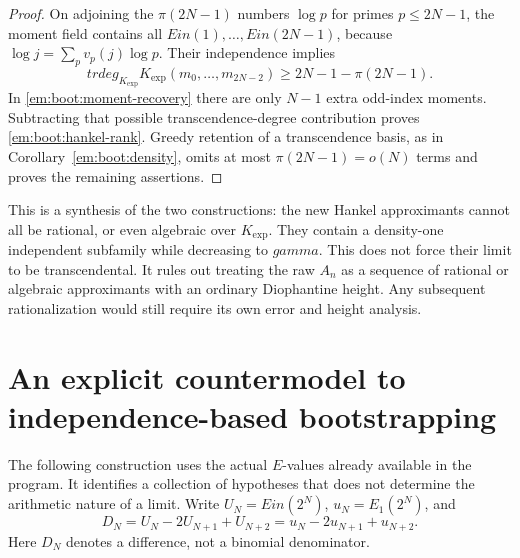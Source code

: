 \documentclass[11pt,a4paper]{article}
\DeclareMathOperator{\Ein}{Ein}
\theoremstyle{definition}
\theoremstyle{remark}
\theoremstyle{plain}
\numberwithin{equation}{section}
\def\Ein{Ein}\def\gamma{gamma}\def\delta{delta}\def\eta{eta}%
\def\operatorname#1{#1}\def\mathrm#1{#1}}
\begin{document}
\begin{proof}
On adjoining the $\pi(2N-1)$ numbers $\log p$ for primes
$p\le2N-1$, the moment field contains all
$\operatorname{Ein}(1),\ldots,\operatorname{Ein}(2N-1)$, because
$\log j=\sum_pv_p(j)\log p$. Their independence implies
\[
 \operatorname{trdeg}_{K_{\exp}}
 K_{\exp}(m_0,\ldots,m_{2N-2})
 \ge2N-1-\pi(2N-1).
\]
In \eqref{em:boot:moment-recovery} there are only $N-1$ extra odd-index
moments. Subtracting that possible transcendence-degree contribution
proves \eqref{em:boot:hankel-rank}. Greedy retention of a transcendence
basis, as in Corollary~\ref{em:boot:density}, omits at most
$\pi(2N-1)=o(N)$ terms and proves the remaining assertions.
\end{proof}

This is a synthesis of the two constructions: the new Hankel
approximants cannot all be rational, or even algebraic over $K_{\exp}$.
They contain a density-one independent subfamily while decreasing to
$\gamma$. This does not force their limit to be transcendental.
It rules out treating the raw $A_n$ as a sequence of rational or
algebraic approximants with an ordinary Diophantine height. Any
subsequent rationalization would still require its own error and
height analysis.

\section{An explicit countermodel to independence-based bootstrapping}
\label{em:sec:audit-countermodel}

The following construction uses the actual $E$-values already available
in the program. It identifies a collection of hypotheses that does not
determine the arithmetic nature of a limit.
Write $U_N=\Ein(2^N)$, $u_N=E_1(2^N)$, and
\[
 D_N=U_N-2U_{N+1}+U_{N+2}
     =u_N-2u_{N+1}+u_{N+2}.
\]
Here $D_N$ denotes a difference, not a binomial denominator.
\end{document}
